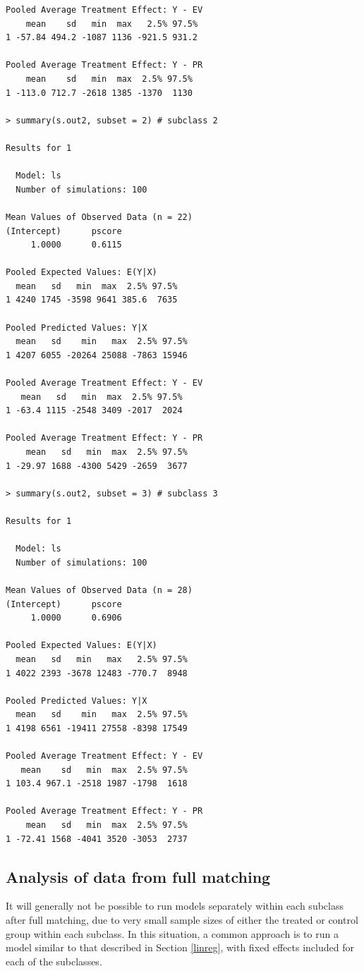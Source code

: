 \documentclass[oneside,letterpaper,titlepage]{article}
\begin{document}
\begin{verbatim}
Pooled Average Treatment Effect: Y - EV
    mean    sd   min  max   2.5% 97.5%
1 -57.84 494.2 -1087 1136 -921.5 931.2

Pooled Average Treatment Effect: Y - PR
    mean    sd   min  max  2.5% 97.5%
1 -113.0 712.7 -2618 1385 -1370  1130

> summary(s.out2, subset = 2) # subclass 2

Results for 1 

  Model: ls 
  Number of simulations: 100 

Mean Values of Observed Data (n = 22) 
(Intercept)      pscore 
     1.0000      0.6115 

Pooled Expected Values: E(Y|X)
  mean   sd   min  max  2.5% 97.5%
1 4240 1745 -3598 9641 385.6  7635

Pooled Predicted Values: Y|X
  mean   sd    min   max  2.5% 97.5%
1 4207 6055 -20264 25088 -7863 15946

Pooled Average Treatment Effect: Y - EV
   mean   sd   min  max  2.5% 97.5%
1 -63.4 1115 -2548 3409 -2017  2024

Pooled Average Treatment Effect: Y - PR
    mean   sd   min  max  2.5% 97.5%
1 -29.97 1688 -4300 5429 -2659  3677

> summary(s.out2, subset = 3) # subclass 3

Results for 1 

  Model: ls 
  Number of simulations: 100 

Mean Values of Observed Data (n = 28) 
(Intercept)      pscore 
     1.0000      0.6906 

Pooled Expected Values: E(Y|X)
  mean   sd   min   max   2.5% 97.5%
1 4022 2393 -3678 12483 -770.7  8948

Pooled Predicted Values: Y|X
  mean   sd    min   max  2.5% 97.5%
1 4198 6561 -19411 27558 -8398 17549

Pooled Average Treatment Effect: Y - EV
   mean    sd   min  max  2.5% 97.5%
1 103.4 967.1 -2518 1987 -1798  1618

Pooled Average Treatment Effect: Y - PR
    mean   sd   min  max  2.5% 97.5%
1 -72.41 1568 -4041 3520 -3053  2737

\end{verbatim}

\subsection{Analysis of data from full matching}
\label{fullmatchanal}
It will generally not be possible to run models
separately within each subclass after full matching, due to very small sample sizes of either the treated or
control group within each subclass.  In this situation, a common approach is to run a model similar to that 
described in Section \ref{linreg}, with fixed effects included for each of the subclasses. 
\end{document}
